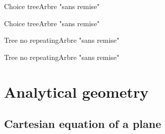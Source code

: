 \documentclass[a4paper,english,11pt]{article}
\begin{document}
\begin{myprestexcode}{Choice tree}{Arbre "sans remise"}

\end{myprestexcode}

\begin{myprestex}{Choice tree}{Arbre "sans remise"}
\end{myprestex}

\begin{myprestexcode}{Tree no repeating}{Arbre "sans remise"}

\end{myprestexcode}

\begin{myprestex}{Tree no repeating}{Arbre "sans remise"}
\end{myprestex}

\newpage

\section{Analytical geometry}

\subsection{Cartesian equation of a plane}
\end{document}
